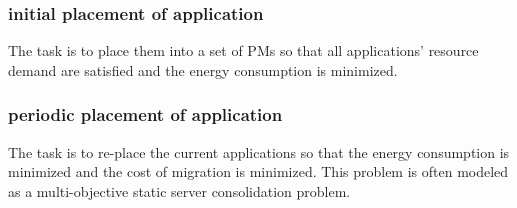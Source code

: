 \subsubsection{initial placement of application}

 The task is to place them into a set of PMs \cite{Mishra:2012kx} so that all applications' resource demand are satisfied and the energy consumption is minimized.



\subsubsection{periodic placement of application} 

 The task is to re-place the current applications so that the energy consumption is minimized and the cost of migration is minimized. This problem is often modeled as a multi-objective static server consolidation problem. 



